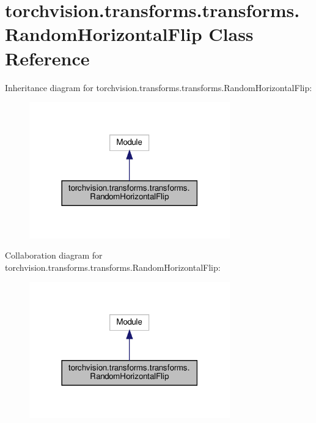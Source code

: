 \hypertarget{classtorchvision_1_1transforms_1_1transforms_1_1RandomHorizontalFlip}{}\section{torchvision.\+transforms.\+transforms.\+Random\+Horizontal\+Flip Class Reference}
\label{classtorchvision_1_1transforms_1_1transforms_1_1RandomHorizontalFlip}


Inheritance diagram for torchvision.\+transforms.\+transforms.\+Random\+Horizontal\+Flip\+:
\nopagebreak
\begin{figure}[H]
\begin{center}
\leavevmode
\includegraphics[width=246pt]{classtorchvision_1_1transforms_1_1transforms_1_1RandomHorizontalFlip__inherit__graph}
\end{center}
\end{figure}


Collaboration diagram for torchvision.\+transforms.\+transforms.\+Random\+Horizontal\+Flip\+:
\nopagebreak
\begin{figure}[H]
\begin{center}
\leavevmode
\includegraphics[width=246pt]{classtorchvision_1_1transforms_1_1transforms_1_1RandomHorizontalFlip__coll__graph}
\end{center}
\end{figure}
